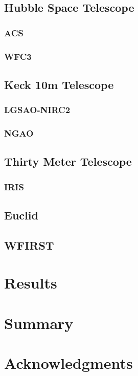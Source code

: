 \documentclass[useAMS,usenatbib]{mn2e}
\begin{document}
\subsection{Hubble Space Telescope}
\subsubsection{ACS}
\subsubsection{WFC3}
\subsection{Keck 10m Telescope}
\subsubsection{LGSAO-NIRC2}
\subsubsection{NGAO}
\subsection{Thirty Meter Telescope}
\subsubsection{IRIS}
\subsection{Euclid}
\subsection{WFIRST}

\section{Results}

\section{Summary}

\section*{Acknowledgments}
\end{document}

